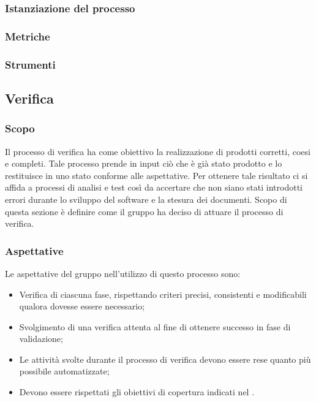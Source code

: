 \subsubsection{Istanziazione del processo}
\subsubsection{Metriche}
\subsubsection{Strumenti}

\vspace{2cm}

\subsection{Verifica} \label{subsection: Verifica}
\subsubsection{Scopo}
Il processo di verifica ha come obiettivo la realizzazione di prodotti corretti, coesi e completi. Tale processo prende in input ciò che è già stato prodotto e lo restituisce in uno stato conforme alle aspettative. Per ottenere tale risultato ci si affida a processi di analisi e test così da accertare che non siano stati introdotti errori durante lo sviluppo del software e la stesura dei documenti. Scopo di questa sezione è definire come il gruppo ha deciso di attuare il processo di verifica.

\subsubsection{Aspettative}
Le aspettative del gruppo \groupName{} nell'utilizzo di questo processo sono:
\begin{itemize}
    \item Verifica di ciascuna fase, rispettando criteri precisi, consistenti e modificabili qualora dovesse essere necessario;
    \item Svolgimento di una verifica attenta al fine di ottenere successo in fase di validazione;
    \item Le attività svolte durante il processo di verifica devono essere rese quanto più possibile automatizzate;
    \item Devono essere rispettati gli obiettivi di copertura indicati nel \docNamePdQLow{}.
\end{itemize}

